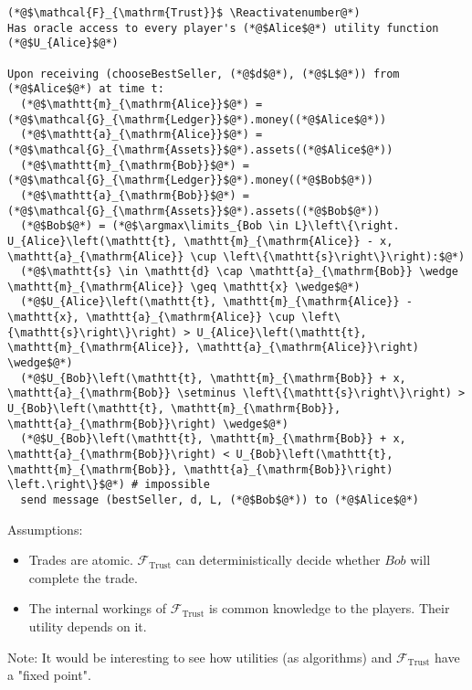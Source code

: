 \Suppressnumber
\begin{lstlisting}[label=trustfunc, style=numbers]
(*@$\mathcal{F}_{\mathrm{Trust}}$ \Reactivatenumber@*)
Has oracle access to every player's (*@$Alice$@*) utility function (*@$U_{Alice}$@*)

Upon receiving (chooseBestSeller, (*@$d$@*), (*@$L$@*)) from (*@$Alice$@*) at time t:
  (*@$\mathtt{m}_{\mathrm{Alice}}$@*) = (*@$\mathcal{G}_{\mathrm{Ledger}}$@*).money((*@$Alice$@*))
  (*@$\mathtt{a}_{\mathrm{Alice}}$@*) = (*@$\mathcal{G}_{\mathrm{Assets}}$@*).assets((*@$Alice$@*))
  (*@$\mathtt{m}_{\mathrm{Bob}}$@*) = (*@$\mathcal{G}_{\mathrm{Ledger}}$@*).money((*@$Bob$@*))
  (*@$\mathtt{a}_{\mathrm{Bob}}$@*) = (*@$\mathcal{G}_{\mathrm{Assets}}$@*).assets((*@$Bob$@*))
  (*@$Bob$@*) = (*@$\argmax\limits_{Bob \in L}\left\{\right. U_{Alice}\left(\mathtt{t}, \mathtt{m}_{\mathrm{Alice}} - x, \mathtt{a}_{\mathrm{Alice}} \cup \left\{\mathtt{s}\right\}\right):$@*)
  (*@$\mathtt{s} \in \mathtt{d} \cap \mathtt{a}_{\mathrm{Bob}} \wedge \mathtt{m}_{\mathrm{Alice}} \geq \mathtt{x} \wedge$@*)
  (*@$U_{Alice}\left(\mathtt{t}, \mathtt{m}_{\mathrm{Alice}} - \mathtt{x}, \mathtt{a}_{\mathrm{Alice}} \cup \left\{\mathtt{s}\right\}\right) > U_{Alice}\left(\mathtt{t}, \mathtt{m}_{\mathrm{Alice}}, \mathtt{a}_{\mathrm{Alice}}\right) \wedge$@*)
  (*@$U_{Bob}\left(\mathtt{t}, \mathtt{m}_{\mathrm{Bob}} + x, \mathtt{a}_{\mathrm{Bob}} \setminus \left\{\mathtt{s}\right\}\right) > U_{Bob}\left(\mathtt{t}, \mathtt{m}_{\mathrm{Bob}}, \mathtt{a}_{\mathrm{Bob}}\right) \wedge$@*)
  (*@$U_{Bob}\left(\mathtt{t}, \mathtt{m}_{\mathrm{Bob}} + x, \mathtt{a}_{\mathrm{Bob}}\right) < U_{Bob}\left(\mathtt{t}, \mathtt{m}_{\mathrm{Bob}}, \mathtt{a}_{\mathrm{Bob}}\right) \left.\right\}$@*) # impossible
  send message (bestSeller, d, L, (*@$Bob$@*)) to (*@$Alice$@*)
\end{lstlisting}

Assumptions:
\begin{itemize}
  \item Trades are atomic. $\mathcal{F}_{\mathrm{Trust}}$ can deterministically decide whether
  $Bob$ will complete the trade.
  \item The internal workings of $\mathcal{F}_{\mathrm{Trust}}$ is common knowledge to the players.
  Their utility depends on it.
\end{itemize}
Note: It would be interesting to see how utilities (as algorithms) and
$\mathcal{F}_{\mathrm{Trust}}$ have a "fixed point".
